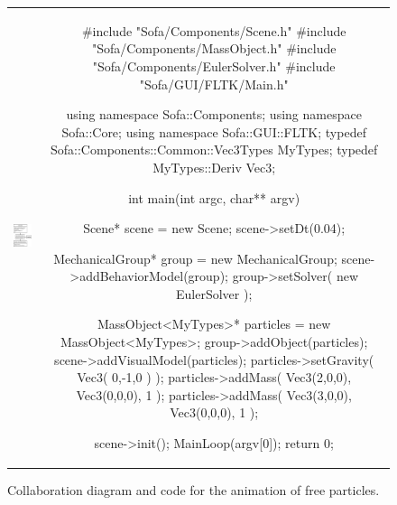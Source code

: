 \begin{figure}[htp]
\begin{center} \begin{tabular}{cc}
\begin{minipage}[b]{6cm}
	\includegraphics*[width=6cm]{fig/singleParticleCollaboration.eps}  
\end{minipage}
 &
\begin{minipage}[b]{9cm} 
\begin{code_cpp}
#include "Sofa/Components/Scene.h"
#include "Sofa/Components/MassObject.h"
#include "Sofa/Components/EulerSolver.h"
#include "Sofa/GUI/FLTK/Main.h"

using namespace Sofa::Components;
using namespace Sofa::Core;
using namespace Sofa::GUI::FLTK;
typedef Sofa::Components::Common::Vec3Types MyTypes;
typedef MyTypes::Deriv Vec3;
        
int main(int argc, char** argv) 
{
    Scene* scene = new Scene;
    scene->setDt(0.04);
    
    MechanicalGroup* group = new MechanicalGroup;
    scene->addBehaviorModel(group);
    group->setSolver( new EulerSolver );
    
    MassObject<MyTypes>* particles = new MassObject<MyTypes>;
    group->addObject(particles);
    scene->addVisualModel(particles);                 
    particles->setGravity( Vec3( 0,-1,0 ) );
    particles->addMass( Vec3(2,0,0), Vec3(0,0,0), 1 ); 
    particles->addMass( Vec3(3,0,0), Vec3(0,0,0), 1 );


    scene->init();
    MainLoop(argv[0]);
    return 0;
}
\end{code_cpp}
\end{minipage}
\end{tabular}
\end{center}
\label{fig:singleParticleCollaboration} 
\caption{Collaboration diagram and code for the animation of free particles.}
\end{figure}

